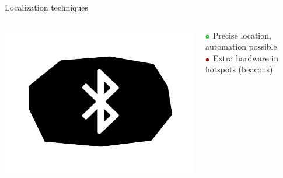 \documentclass[11pt]{beamer}
\begin{document}
\begin{frame}[t]{Localization techniques}

  \begin{columns}[c]

    \begin{column}{0.2\textwidth}
      \includegraphics[width=\textwidth]{beacon-symbol}
    \end{column}

    \hfill

    \begin{column}{0.8\textwidth}

      \includegraphics[width=0.05\textwidth]{plus} Precise location, automation possible\\
      \includegraphics[width=0.05\textwidth]{minus} Extra hardware in hotspots (beacons)

    \end{column}

  \end{columns}



\end{frame}
\end{document}
